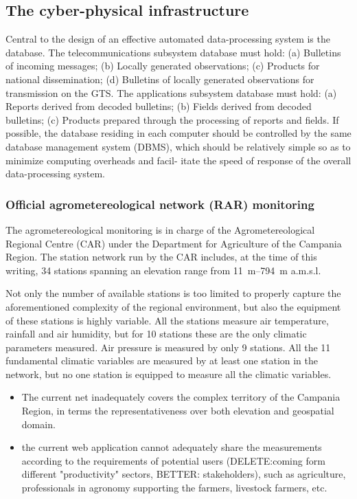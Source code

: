 \documentclass[authoryear,preprint,review,12pt]{elsarticle}
\begin{document}
\subsection{The cyber-physical infrastructure}

Central to the design of an effective automated data-processing system is the database. The telecommunications subsystem database must hold:
(a) Bulletins of incoming messages;
(b) Locally generated observations;
(c) Products for national dissemination;
(d) Bulletins of locally generated observations for transmission on the GTS.
The applications subsystem database must hold:
(a) Reports derived from decoded bulletins;
(b) Fields derived from decoded bulletins;
(c) Products prepared through the processing of reports and fields.
If possible, the database residing in each computer should be controlled by the same database
management system (DBMS), which should be relatively simple so as to minimize computing overheads and facil- itate the speed of response of the overall data-processing system.
    
\subsubsection{Official agrometereological network (RAR) monitoring}\label{RARStructure}
The agrometereological monitoring is in charge of the Agrometereological Regional Centre (CAR) under the Department for Agriculture of the Campania Region. The station network run by the CAR includes, at the time of this writing, 34 stations spanning an elevation range from \SIrange{11}{794}{\metre} a.m.s.l.

Not only the number of available stations is too limited to properly capture the aforementioned complexity of the regional environment, but also the equipment of these stations is highly variable.
All the stations measure air temperature, rainfall and air humidity, but for 10 stations these are the only climatic parameters measured.
Air pressure is measured by only 9 stations.
All the 11 fundamental climatic variables are measured by at least one station in the network, but no one station is equipped to measure all the climatic variables.

\begin{itemize}
    \item The current net inadequately covers the complex territory of the Campania Region, in terms the representativeness over both elevation and geospatial domain.
    \item the current web application cannot adequately share the measurements according to the requirements of potential users (DELETE:coming form different "productivity" sectors, BETTER: stakeholders), such as agriculture, professionals in agronomy supporting the farmers, livestock farmers, etc.
\end{itemize}
\end{document}
